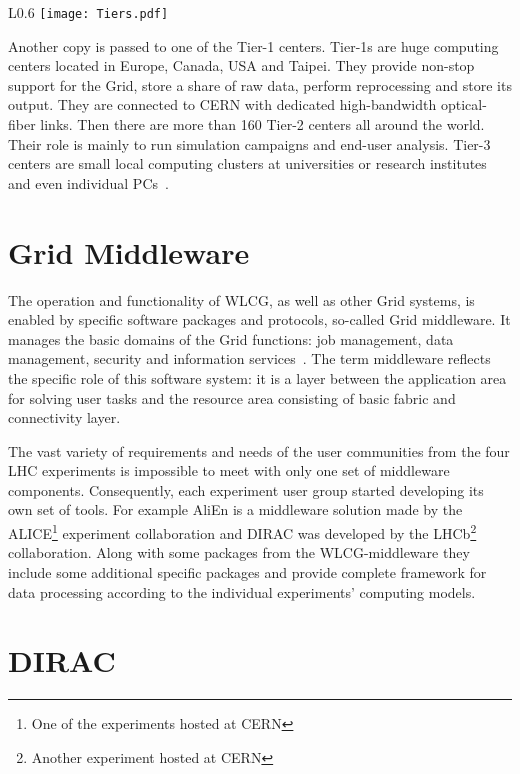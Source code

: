 \begin{wrapfigure}{L}{0.6\textwidth}
\centering
\texttt{[image: Tiers.pdf]}
\caption{The WLCG Tier-1 centers with CERN Tier-0 in the middle}
\label{fig:WLCG}
\end{wrapfigure}

Another copy is passed to one of the Tier-1 centers. Tier-1s are huge computing centers located in Europe, Canada, USA 
and Taipei. They provide non-stop support for the Grid, store a share of raw data, perform reprocessing and store 
its output. They are connected to CERN with dedicated high-bandwidth optical-fiber links. Then there are more than 
160 Tier-2 centers all around the world. Their role is mainly to run simulation campaigns and end-user analysis. 
Tier-3 centers are small local computing clusters at universities or research institutes and even individual 
PCs~\cite{TGrid}.

\section*{Grid Middleware}

The operation and functionality of WLCG, as well as other Grid systems, is enabled by specific software packages 
and protocols, so-called Grid middleware. It manages the basic domains of the Grid functions: job management, 
data management, security and information services~\cite{GriCom}. The term middleware reflects the specific role 
of this software system: it is a layer between the application area for solving user tasks 
and the resource area consisting of basic fabric and connectivity layer. 

The vast variety of requirements and needs of the user communities from the four LHC experiments is impossible to 
meet with only one set of middleware components. Consequently, each experiment user group started developing its 
own set of tools. For example AliEn is a middleware solution made by the 
ALICE\footnote{One of the experiments hosted at CERN} experiment collaboration and DIRAC was developed by the 
LHCb\footnote{Another experiment hosted at CERN} collaboration. Along with some packages from the WLCG-middleware 
they include some additional specific packages and provide complete framework for data processing according to the 
individual experiments' computing models.

\section*{DIRAC}

